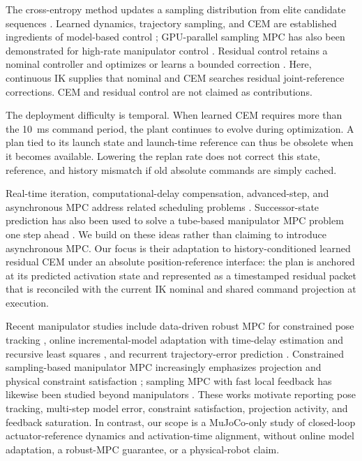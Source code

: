 \documentclass[conference]{IEEEtran}
\begin{document}
The cross-entropy method updates a sampling distribution from elite candidate sequences \cite{deboer2005tutorial}. Learned dynamics, trajectory sampling, and CEM are established ingredients of model-based control \cite{chua2018pets}; GPU-parallel sampling MPC has also been demonstrated for high-rate manipulator control \cite{bhardwaj2022storm}. Residual control retains a nominal controller and optimizes or learns a bounded correction \cite{johannink2019residual}. Here, continuous IK supplies that nominal and CEM searches residual joint-reference corrections. CEM and residual control are not claimed as contributions.

The deployment difficulty is temporal. When learned CEM requires more than the 10~ms command period, the plant continues to evolve during optimization. A plan tied to its launch state and launch-time reference can thus be obsolete when it becomes available. Lowering the replan rate does not correct this state, reference, and history mismatch if old absolute commands are simply cached.

Real-time iteration, computational-delay compensation, advanced-step, and asynchronous MPC address related scheduling problems \cite{diehl2005rti,zavala2009advanced,findeisen2004delay,dirckx2025asap}. Successor-state prediction has also been used to solve a tube-based manipulator MPC problem one step ahead \cite{luo2024smooth}. We build on these ideas rather than claiming to introduce asynchronous MPC. Our focus is their adaptation to history-conditioned learned residual CEM under an absolute position-reference interface: the plan is anchored at its predicted activation state and represented as a timestamped residual packet that is reconciled with the current IK nominal and shared command projection at execution.

Recent manipulator studies include data-driven robust MPC for constrained pose tracking \cite{chen2024ddrmpc}, online incremental-model adaptation with time-delay estimation and recursive least squares \cite{wang2025incremental}, and recurrent trajectory-error prediction \cite{ma2025trajectory}. Constrained sampling-based manipulator MPC increasingly emphasizes projection and physical constraint satisfaction \cite{wang2025constrained}; sampling MPC with fast local feedback has likewise been studied beyond manipulators \cite{belvedere2026feedback}. These works motivate reporting pose tracking, multi-step model error, constraint satisfaction, projection activity, and feedback saturation. In contrast, our scope is a MuJoCo-only study of closed-loop actuator-reference dynamics and activation-time alignment, without online model adaptation, a robust-MPC guarantee, or a physical-robot claim.
\end{document}
